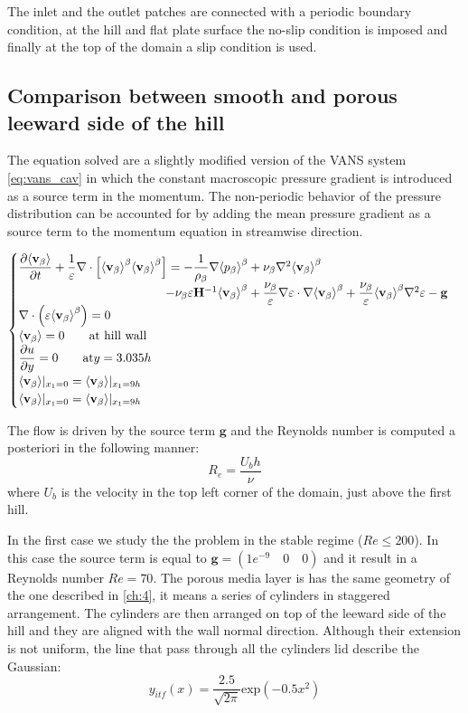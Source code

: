 The inlet and the outlet patches are connected with a periodic boundary condition, at the hill and flat plate surface the no-slip condition is imposed and finally at the top of the domain a slip condition is used.





\subsection{Comparison between smooth and porous leeward side of the hill}

The equation solved are a slightly modified version of the VANS system \eqref{eq:vans_cav} in which the constant macroscopic pressure gradient is introduced as a source term in the momentum.
The non-periodic behavior of the pressure distribution can be accounted for by adding the mean pressure gradient as a source term to the momentum equation in streamwise direction.

\begin{eqnarray}
\begin{cases}
\dfrac{\partial {\left< \textbf{v}_{\beta} \right>}}{\partial t} + \dfrac{1}{\varepsilon} \nabla \cdot \left[  {\left< \textbf{v}_{\beta} \right>}^{\beta}  {\left< \textbf{v}_{\beta} \right>}^{\beta} \right] = -\dfrac{1}{\rho_{\beta}} \nabla {\left< p_{\beta}\right>}^{\beta} + \nu_{\beta} \nabla^2 {\left< \textbf{v}_{\beta} \right>}^{\beta} \\ 
\qquad \qquad \qquad \qquad \qquad \qquad- \nu_{\beta} \varepsilon \mathbf{H}^{-1} {\left< \textbf{v}_{\beta} \right>}^{\beta} +\dfrac{\nu_{\beta}}{\varepsilon} \nabla \varepsilon \cdot \nabla {\left< \textbf{v}_{\beta} \right>}^{\beta} + \dfrac{\nu_{\beta}}{\varepsilon} {\left< \textbf{v}_{\beta} \right>}^{\beta} \nabla^2 \varepsilon - \mathbf{g}\\
\nabla \cdot \left(\varepsilon {\left< \textbf{v}_{\beta} \right>}^{\beta} \right) = 0\\
{\left< \textbf{v}_{\beta} \right>} = 0 \qquad \textrm{at hill wall} \\
\dfrac{\partial u}{\partial y}=0 \qquad \textrm{at} y = 3.035h\\
{\left< \textbf{v}_{\beta} \right>}|_{x_1 = 0} = {\left< \textbf{v}_{\beta} \right>}|_{x_1 = 9h} \\
{\left< \textbf{v}_{\beta} \right>}|_{x_1 = 0} = {\left< \textbf{v}_{\beta} \right>}|_{x_1 = 9h} 
\end{cases}
\end{eqnarray}

The flow is driven by the source term $\mathbf{g}$ and the Reynolds number is computed a posteriori in the following manner:
$$
R_e = \dfrac{U_b h}{\nu}
$$
where $U_b$ is the velocity in the top left corner of the domain, just above the first hill.

In the first case we study the the problem in the stable regime ($Re\leq200$). In this case the source term is equal to $\mathbf{g} = (1e^{-9} \quad0 \quad0)$ and it result in a Reynolds number $Re=70$.
The porous media layer is has the same geometry of the one described in \ref{ch:4}, it means a series of cylinders in staggered arrangement. The cylinders are then arranged on top of the leeward side of the hill and they are aligned with the wall normal direction. Although their extension is not uniform, the line that pass through all the cylinders lid describe the Gaussian:
\begin{equation}
	y_{itf}(x) = \dfrac{2.5}{\sqrt{2\pi}} \textrm{exp}\left( -0.5 x^2 \right)
	\label{eq:gaussian}
\end{equation}

